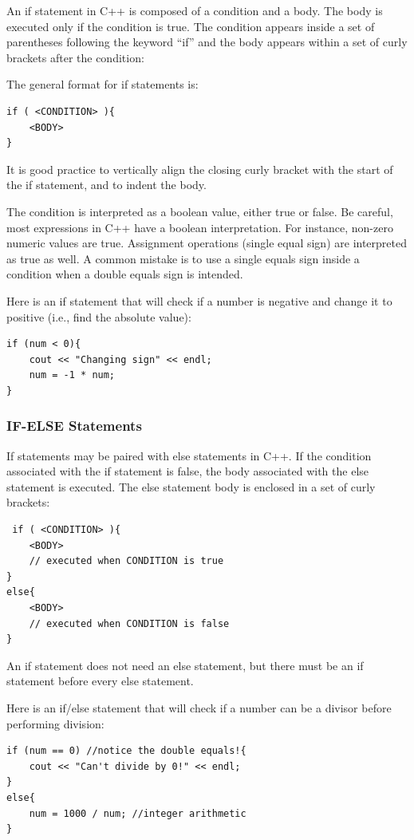 An if statement in C++ is composed of a condition and a body. The body is executed only if the condition is true. The condition appears inside a set of parentheses following the keyword “if” and the body appears within a set of curly brackets after the condition:

The general format for if statements is:

\begin{verbatim}
if ( <CONDITION> ){
    <BODY>
}    
\end{verbatim}

It is good practice to vertically align the closing curly bracket with the start of the if statement, and to indent the body.

The condition is interpreted as a boolean value, either true or false. Be careful, most expressions in C++ have a boolean interpretation. For instance, non-zero numeric values are true. Assignment operations (single equal sign) are interpreted as true as well. A common mistake is to use a single equals sign inside a condition when a double equals sign is intended.

\begin{example}
    Here is an if statement that will check if a number is negative and change it to positive (i.e., find the absolute value):

    \begin{verbatim}
if (num < 0){
    cout << "Changing sign" << endl;
    num = -1 * num;
}
    \end{verbatim}
\end{example}

\subsubsection{IF-ELSE Statements}
 If statements may be paired with else statements in C++. If the condition associated with the if statement is false, the body associated with the else statement is executed. The else statement body is enclosed in a set of curly brackets:

 \begin{verbatim}
 if ( <CONDITION> ){
    <BODY>
    // executed when CONDITION is true
}
else{
    <BODY>
    // executed when CONDITION is false
}
 \end{verbatim}

 An if statement does not need an else statement, but there must be an if statement before every else statement.

 \begin{example}
     Here is an if/else statement that will check if a number can be a divisor before performing division:
     \begin{verbatim}
if (num == 0) //notice the double equals!{
    cout << "Can't divide by 0!" << endl;
}
else{
    num = 1000 / num; //integer arithmetic
}         
     \end{verbatim}
 \end{example}

